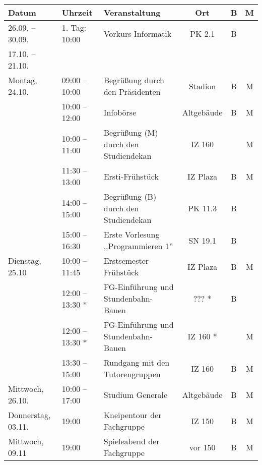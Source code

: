\begin{tabular}{|l|l|p{6.7cm}|c|c|c|}
\hline \textbf{Datum} 		& \textbf{Uhrzeit} 	& \textbf{Veranstaltung}						& \textbf{Ort} 	& \textbf{B}	& \textbf{M} 	\\
\hline 26.09. – 30.09.		& 1. Tag: 10:00	 	& Vorkurs Informatik							& PK 2.1		& B				& 				\\
	   17.10. – 21.10.		& 					& 												& 				& 				&    			\\
\hline Montag,  24.10. 		& 09:00 – 10:00		& Begrüßung	durch den Präsidenten				& Stadion		& B				& M				\\ 
\hline 						& 10:00 – 12:00	 	& Infobörse										& Altgebäude	& B				& M				\\
\hline   					& 10:00 – 11:00	 	& Begrüßung (M) \newline durch den Studiendekan	& IZ 160		& 				& M				\\
\hline 						& 11:30 – 13:00		& Ersti-Frühstück								& IZ Plaza		& B				& M				\\
\hline 						& 14:00 – 15:00	 	& Begrüßung (B) \newline durch den Studiendekan	& PK 11.3		& B				& 				\\
\hline 						& 15:00 – 16:30		& Erste Vorlesung ,,Programmieren 1''			& SN 19.1		& B 			&				\\
\hline Dienstag, 25.10		& 10:00 – 11:45 	& Erstsemester-Frühstück 						& IZ Plaza 		& B 			& M 			\\ 
\hline 						& 12:00 – 13:30 * 	& FG-Einführung und \newline Stundenbahn-Bauen 	& ??? * 		& B 			&  				\\%
\hline 						& 12:00 – 13:30 * 	& FG-Einführung und \newline Stundenbahn-Bauen 	& IZ 160 * 		& 				& M				\\
\hline 						& 13:30 – 15:00 	& Rundgang mit den  Tutorengruppen 				& IZ 160 		& B 			& M				\\
\hline Mittwoch, 26.10.		& 10:00 – 17:00		& Studium Generale								& Altgebäude	& B				& M 			\\
\hline Donnerstag, 03.11. 	& 19:00 			& Kneipentour der Fachgruppe 					& IZ 150 		& B 			& M				\\
\hline Mittwoch, 09.11 		& 19:00 			& Spieleabend der Fachgruppe 					& vor  150 		& B 			& M				\\
\hline
\end{tabular} 

